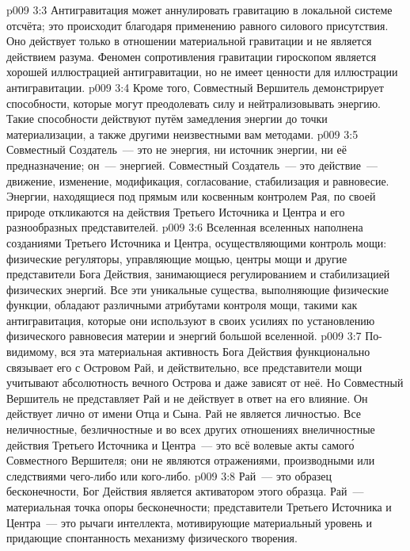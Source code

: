 \vs p009 3:3 \pc Антигравитация может аннулировать гравитацию в локальной системе отсчёта; это происходит благодаря применению равного силового присутствия. Оно действует только в отношении материальной гравитации и не является действием разума. Феномен сопротивления гравитации гироскопом является хорошей иллюстрацией  антигравитации, но не имеет ценности для иллюстрации  антигравитации.
\vs p009 3:4 Кроме того, Совместный Вершитель демонстрирует способности, которые могут преодолевать силу и нейтрализовывать энергию. Такие способности действуют путём замедления энергии до точки материализации, а также другими неизвестными вам методами.
\vs p009 3:5 \pc Совместный Создатель~--- это не энергия, ни источник энергии, ни её предназначение; он~---  энергией. Совместный Создатель~--- это действие~--- движение, изменение, модификация, согласование, стабилизация и равновесие. Энергии, находящиеся под прямым или косвенным контролем Рая, по своей природе откликаются на действия Третьего Источника и Центра и его разнообразных представителей.
\vs p009 3:6 Вселенная вселенных наполнена созданиями Третьего Источника и Центра, осуществляющими контроль мощи: физические регуляторы, управляющие мощью, центры мощи и другие представители Бога Действия, занимающиеся регулированием и стабилизацией физических энергий. Все эти уникальные существа, выполняющие физические функции, обладают различными атрибутами контроля мощи, такими как антигравитация, которые они используют в своих усилиях по установлению физического равновесия материи и энергий большой вселенной.
\vs p009 3:7 По\hyp{}видимому, вся эта материальная активность Бога Действия функционально связывает его с Островом Рай, и действительно, все представители мощи учитывают абсолютность вечного Острова и даже зависят от неё. Но Совместный Вершитель не представляет Рай и не действует в ответ на его влияние. Он действует лично от имени Отца и Сына. Рай не является личностью. Все неличностные, безличностные и во всех других отношениях внеличностные действия Третьего Источника и Центра~--- это всё волевые акты самог\'о Совместного Вершителя; они не являются отражениями, производными или следствиями чего\hyp{}либо или кого\hyp{}либо.
\vs p009 3:8 Рай~--- это образец бесконечности, Бог Действия является активатором этого образца. Рай~--- материальная точка опоры бесконечности; представители Третьего Источника и Центра~--- это рычаги интеллекта, мотивирующие материальный уровень и придающие спонтанность механизму физического творения.
